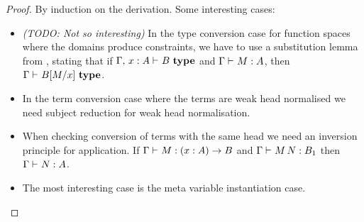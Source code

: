 \begin{proof}
    By induction on the derivation. Some interesting cases:
    \begin{itemize}

	\item {\em (TODO: Not so interesting)} In the type conversion case for
	function spaces where the domains produce constraints, we have to use a
	substitution lemma from {\Core}, stating that if $\IsTypeC {\Ext \Gamma
	x:A} B$ and $\HasTypeC \Gamma M A$, then $\IsTypeC \Gamma {\Subst B x
	M}$.

	\item In the term conversion case where the terms are weak head
	normalised we need subject reduction for weak head normalisation.

	\item When checking conversion of terms with the same head we need an
	inversion principle for application. If $\HasTypeC \Gamma M {\PI x A
	B}$ and $\HasTypeC \Gamma {M \, N} {B_1}$ then $\HasTypeC \Gamma N A$.


	\item The most interesting case is the meta variable instantiation case.

    \end{itemize}
\end{proof}




